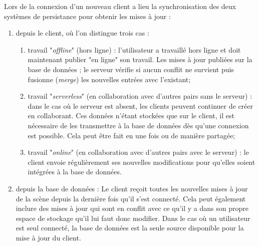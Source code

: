 Lors de la connexion d'un nouveau client a lieu la synchronisation des deux 
systèmes de persistance pour obtenir les mises à jour : 
\begin{enumerate}
	\item depuis le client, où l'on distingue trois cas :
	\begin{enumerate}
		\item travail "\textit{offline}" (hors ligne) : l'utilisateur a travaillé hors ligne et 
		doit maintenant publier "en ligne" son travail. Les mises à jour publiées sur la 
		base de données ; le serveur vérifie si aucun conflit ne survient puis 
		fusionne (\textit{merge}) les nouvelles entrées avec l'existant; 
		
		\item travail "\textit{serverless}" (en collaboration avec d'autres pairs sans le 
		serveur) : dans le cas où le serveur est absent, les clients peuvent continuer 
		de créer en collaborant. Ces données n'étant stockées que sur le client, il est 
		nécessaire de les transmettre à la base de données dès qu'une connexion 
		est possible. 
		Cela peut être fait en une fois ou de manière partagée;
		
		\item travail "\textit{online}" (en collaboration avec d'autres pairs avec le 
		serveur) : le client envoie régulièrement  ses 
		nouvelles modifications pour qu'elles soient intégrées à la base de données.
	\end{enumerate}
	\item depuis la base de données :
	Le client reçoit toutes les nouvelles mises à jour de la scène depuis la dernière 
	fois qu'il s'est connecté. Cela peut également inclure des mises à jour qui sont 
	en conflit avec ce qu'il y a dans son propre espace de stockage qu'il lui faut 
	donc modifier.
	Dans le cas où un utilisateur est seul connecté, la base de données est la 
	seule source disponible pour la mise à jour du client. 
\end{enumerate}




